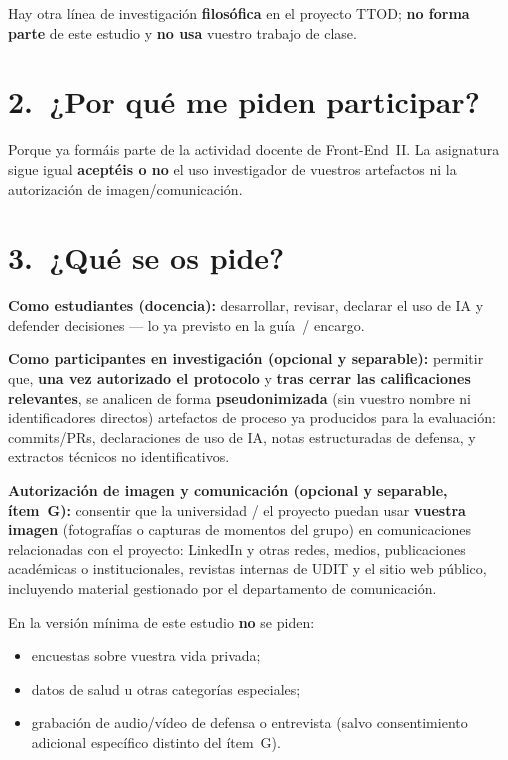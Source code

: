 \documentclass[11pt,a4paper]{scrartcl}
\begin{document}
Hay otra línea de investigación \textbf{filosófica} en el proyecto TTOD;
\textbf{no forma parte} de este estudio y \textbf{no usa} vuestro trabajo
de clase.

\section*{2.\ ¿Por qué me piden participar?}

Porque ya formáis parte de la actividad docente de Front-End~II.
La asignatura sigue igual \textbf{aceptéis o no} el uso investigador
de vuestros artefactos ni la autorización de imagen/comunicación.

\section*{3.\ ¿Qué se os pide?}

\textbf{Como estudiantes (docencia):} desarrollar, revisar, declarar el uso
de IA y defender decisiones --- lo ya previsto en la guía~/ encargo.

\textbf{Como participantes en investigación (opcional y separable):}
permitir que, \textbf{una vez autorizado el protocolo} y
\textbf{tras cerrar las calificaciones relevantes}, se analicen de forma
\textbf{pseudonimizada} (sin vuestro nombre ni identificadores directos)
artefactos de proceso ya producidos para la evaluación: commits/PRs,
declaraciones de uso de IA, notas estructuradas de defensa, y extractos
técnicos no identificativos.

\textbf{Autorización de imagen y comunicación (opcional y separable, ítem~G):}
consentir que la universidad / el proyecto puedan usar \textbf{vuestra imagen}
(fotografías o capturas de momentos del grupo) en comunicaciones
relacionadas con el proyecto: LinkedIn y otras redes, medios, publicaciones
académicas o institucionales, revistas internas de UDIT y el sitio web público,
incluyendo material gestionado por el departamento de comunicación.

En la versión mínima de este estudio \textbf{no} se piden:
\begin{itemize}
  \item encuestas sobre vuestra vida privada;
  \item datos de salud u otras categorías especiales;
  \item grabación de audio/vídeo de defensa o entrevista (salvo consentimiento
        adicional específico distinto del ítem~G).
\end{itemize}
\end{document}

